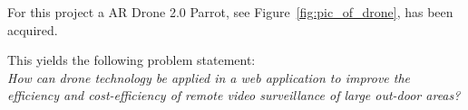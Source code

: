 For this project a AR Drone 2.0 Parrot, see Figure~\ref{fig:pic_of_drone}, has been acquired.

This yields the following problem statement: \\

\textit{How can drone technology be applied in a web application to improve the efficiency and cost-efficiency of remote video surveillance of large out-door areas?}
